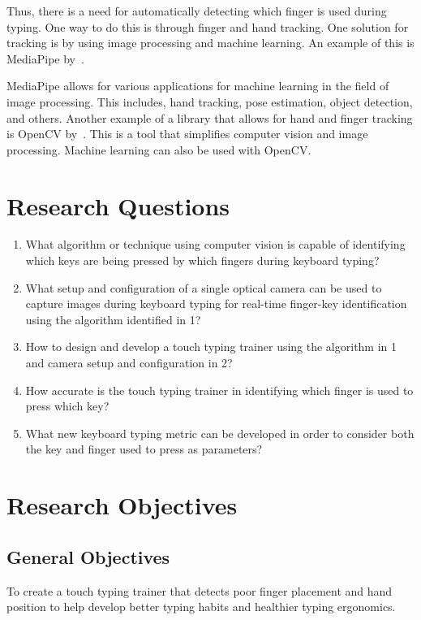 \documentclass{report}
\begin{document}
Thus, there is a need for automatically detecting which finger is used during
typing. One way to do this is through finger and hand tracking. One solution for
tracking is by using image processing and machine learning. An example of this
is MediaPipe by~\cite{mediapipe}.

MediaPipe allows for various applications for machine learning in the field of
image processing. This includes, hand tracking, pose estimation, object
detection, and others. Another example of a library that allows for hand and
finger tracking is OpenCV by~\cite{opencv}. This is a tool that simplifies
computer vision and image processing. Machine learning can also be used with
OpenCV.\@

\section{Research Questions}
\begin{enumerate}
	\item What algorithm or technique using computer vision is capable of
	      identifying which keys are being pressed by which fingers during keyboard
	      typing?
	\item What setup and configuration of a single optical camera can be used to
	      capture images during keyboard typing for real-time finger-key identification
	      using the algorithm identified in 1?
	\item How to design and develop a touch typing trainer using the algorithm in 1
	      and camera setup and configuration in 2?
	\item How accurate is the touch typing trainer in identifying which finger is
	      used to press which key?
	\item What new keyboard typing metric can be developed in order to consider both
	      the key and finger used to press as parameters?
\end{enumerate}

\section{Research Objectives}

\subsection{General Objectives}
To create a touch typing trainer that detects poor finger placement and hand
position to help develop better typing habits and healthier typing ergonomics.
\end{document}
